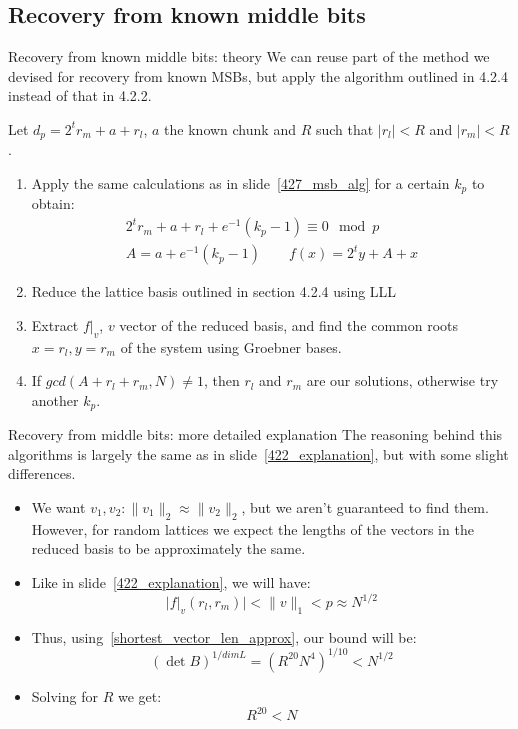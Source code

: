 \documentclass[usepdftitle=false]{beamer}
\begin{document}
\subsection{Recovery from known middle bits}
\begin{frame}{Recovery from known middle bits: theory}\label{427_mid_alg}
We can reuse part of the method we devised for recovery from known MSBs,  but apply the algorithm 
outlined in 4.2.4 instead of that in 4.2.2.
\vspace{10pt}

Let $d_p = 2^t r_m + a + r_l$, $a$ the known chunk and $R$ such that $|r_l| < R$ and $|r_m| < R$.
\begin{enumerate}
    \item Apply the same calculations as in slide~\ref{427_msb_alg} for a certain $k_p$ to obtain:
        \begin{align}
            2^t r_m + a + r_l + e^{-1}(k_p - 1) \equiv 0 \mod p \\
            A = a + e^{-1}(k_p - 1) \quad\quad f(x) = 2^t y  + A + x\label{424_poly}
        \end{align}
    \item Reduce the lattice basis outlined in section 4.2.4 using LLL
    \item Extract $f|_v$, $v$ vector of the reduced basis, and find the common roots $x=r_l, y=r_m$ of
          the system using Groebner bases.
    \item If $gcd(A + r_l + r_m, N) \neq 1$, then $r_l$ and $r_m$ are our solutions, otherwise try 
          another $k_p$.
\end{enumerate}
\end{frame}
\begin{frame}{Recovery from middle bits: more detailed explanation}
The reasoning behind this algorithms is largely the same as in slide~\ref{422_explanation}, but with
some slight differences.

\begin{itemize}
    \item We want $v_1, v_2 : \|v_1\|_2 \approx \|v_2\|_2$, but we aren't guaranteed to find them. However,
          for random lattices we expect the lengths of the vectors in the reduced basis to be approximately
          the same. 
    \item Like in slide~\ref{422_explanation}, we will have:
          $$
          |f|_v(r_l, r_m)| < \|v\|_1 < p \approx N^{1/2}
          $$
    \item Thus, using~\ref{shortest_vector_len_approx}, our bound will be:
          $$
          (\det B)^{1/dimL} = (R^{20}N^4)^{1/10} < N^{1/2} 
          $$
    \item Solving for $R$ we get:
          $$
          R^{20} < N
          $$
\end{itemize}
\end{frame}
\end{document}
